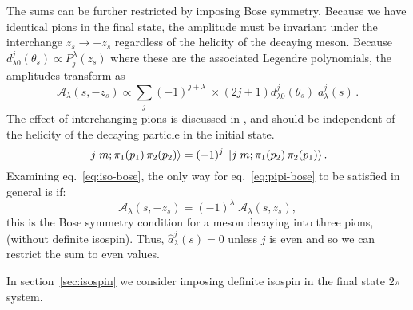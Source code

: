 \documentclass[10pt, aps,prd,amsmath,amssymb,superscriptaddress,onecolumn,
nofootinbib,showpacs,preprintnumbers]{revtex4-1}
\begin{document}
The sums can be further restricted by imposing Bose symmetry. Because we have identical pions in the final state, the amplitude must be invariant under the interchange \(z_s \to -z_s\) regardless of the helicity of the decaying meson.
Because \(d^j_{\lambda0}(\theta_s) \propto P^\lambda_j(z_s)\) where these are the associated Legendre polynomials, the amplitudes transform as
  \begin{equation}
    \label{eq:iso-bose}
   \mathcal{A}_\lambda(s, -z_s) \propto \sum_{j} (-1)^{j+\lambda} \; \times (2j+1) d^j_{\lambda0}(\theta_s) \; a^j_\lambda(s) \,.
  \end{equation}
The effect of interchanging pions is discussed in \cite{JACOB1959404}, and should be independent of the helicity of the decaying particle in the initial state.
  \begin{equation}
    \label{eq:pipi-bose}
    \ket{j \; m ; \pi_1(p_1) \, \pi_2(p_2)} = (-1)^j \; \ket{j \; m; \pi_1(p_2) \, \pi_2(p_1)}.
  \end{equation}
Examining eq.~\ref{eq:iso-bose}, the only way for eq.~\ref{eq:pipi-bose} to be satisfied in general is if:
  \begin{equation}
    \label{eq:helicity-bose}
    \mathcal{A}_\lambda(s,-z_s) = (-1)^\lambda \; \mathcal{A}_\lambda(s, z_s),
  \end{equation}
this is the Bose symmetry condition for a meson decaying into three pions, (without definite isospin).
Thus, \(\hat{a}^j_{\lambda}(s) = 0\) unless \(j\) is even and so we can restrict the sum to even values.

 In section~\ref{sec:isospin} we consider imposing definite isospin in the final state \(2\pi\) system.
\end{document}
